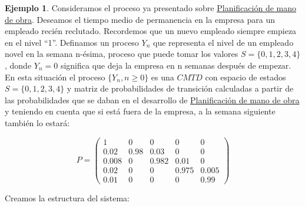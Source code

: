 \documentclass[
]{book}
\theoremstyle{definition}
\theoremstyle{definition}
\newtheorem{example}{Ejemplo}[chapter]
\theoremstyle{definition}
\theoremstyle{definition}
\theoremstyle{remark}
\begin{document}
\begin{example}
Consideramos el proceso ya presentado sobre \protect\hyperlink{planificacion}{Planificación de mano de obra}. Deseamos el tiempo medio de permanencia en la empresa para un empleado recién reclutado. Recordemos que un nuevo empleado siempre empieza en el nivel ``1''. Definamos un proceso \(Y_n\) que representa el nivel de un empleado novel en la semana n-ésima, proceso que puede tomar los valores \(S = \{0, 1, 2, 3, 4\}\), donde \(Y_n=0\) significa que deja la empresa en n semanas después de empezar. En esta situación el proceso \(\{Y_n, n \geq 0\}\) es una \(CMTD\) con espacio de estados \(S = \{0, 1, 2, 3, 4\}\) y matriz de probabilidades de transición calculadas a partir de las probabilidades que se daban en el desarrollo de \protect\hyperlink{planificacion}{Planificación de mano de obra} y teniendo en cuenta que si está fuera de la empresa, a la semana siguiente también lo estará:

\[P = 
\begin{pmatrix}
1 & 0 & 0 & 0 & 0 \\
0.02 & 0.98 & 0.03 & 0 & 0\\
0.008 & 0 & 0.982 & 0.01 & 0\\
0.02 & 0 & 0 & 0.975 & 0.005\\
0.01 & 0 & 0 & 0 & 0.99
\end{pmatrix}\]
\end{example}

Creamos la estructura del sistema:
\end{document}
